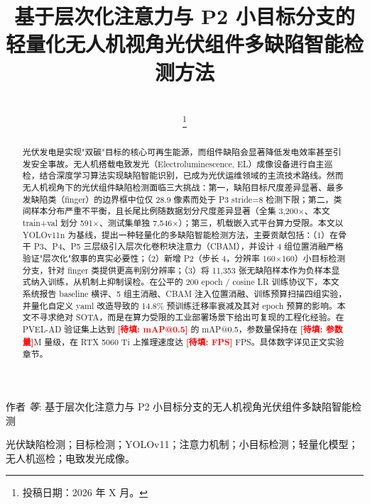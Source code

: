 \documentclass[journal,onecolumn,11pt]{IEEEtran}
\makeatletter
\newcommand{\TBF}[1]{\textcolor{red}{\textbf{[待填: #1]}}}
\newcommand{\mAPHalf}{\TBF{mAP@0.5}}
\newcommand{\paramsM}{\TBF{参数量}}
\newcommand{\fpsVal}{\TBF{FPS}}
\makeatother
\begin{document}
\title{基于层次化注意力与 P2 小目标分支的轻量化无人机视角光伏组件多缺陷智能检测方法}

\author{
\\
\thanks{投稿日期：2026 年 X 月。}
}

%
{作者 \MakeLowercase{\textit{等}}: 基于层次化注意力与 P2 小目标分支的无人机视角光伏组件多缺陷智能检测}

\maketitle

\begin{abstract}
光伏发电是实现"双碳"目标的核心可再生能源，而组件缺陷会显著降低发电效率甚至引发安全事故。无人机搭载电致发光（Electroluminescence, EL）成像设备进行自主巡检，结合深度学习算法实现缺陷智能识别，已成为光伏运维领域的主流技术路线。然而无人机视角下的光伏组件缺陷检测面临三大挑战：第一，缺陷目标尺度差异显著、最多发缺陷类（finger）的边界框中位仅 28.9 像素而处于 P3 stride=8 检测下限；第二，类间样本分布严重不平衡，且长尾比例随数据划分尺度差异显著（全集 3{,}200$\times$、本文 train+val 划分 591$\times$、测试集单独 7{,}546$\times$）；第三，机载嵌入式平台算力受限。本文以 YOLOv11n 为基线，提出一种轻量化的多缺陷智能检测方法，主要贡献包括：（1）在骨干 P3、P4、P5 三层级引入层次化卷积块注意力（CBAM），并设计 4 组位置消融严格验证"层次化"叙事的真实必要性；（2）新增 P2（步长 4，分辨率 160$\times$160）小目标检测分支，针对 finger 类提供更高判别分辨率；（3）将 11{,}353 张无缺陷样本作为负样本显式纳入训练，从机制上抑制误检。在公平的 200 epoch / cosine LR 训练协议下，本文系统报告 baseline 横评、5 组主消融、CBAM 注入位置消融、训练预算扫描四组实验，并量化自定义 yaml 改造导致的 14.8\% 预训练迁移率衰减及其对 epoch 预算的影响。本文不寻求绝对 SOTA，而是在算力受限的工业部署场景下给出可复现的工程化经验。在 PVEL-AD 验证集上达到 \mAPHalf{} 的 mAP@0.5，参数量保持在 \paramsM{}M 量级，在 RTX 5060 Ti 上推理速度达 \fpsVal{} FPS。具体数字详见正文实验章节。
\end{abstract}

\begin{IEEEkeywords}
光伏缺陷检测；目标检测；YOLOv11；注意力机制；小目标检测；轻量化模型；无人机巡检；电致发光成像。
\end{IEEEkeywords}
\end{document}

